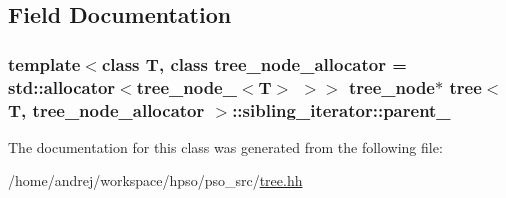 \subsection{Field Documentation}
\hypertarget{classtree_1_1sibling__iterator_204f7449ee908f982d21cc3d334d25bc}{
\subsubsection{\setlength{\rightskip}{0pt plus 5cm}template$<$class T, class tree\_\-node\_\-allocator = std::allocator$<$tree\_\-node\_\-$<$T$>$ $>$$>$ {\bf tree\_\-node}$\ast$ {\bf tree}$<$ T, tree\_\-node\_\-allocator $>$::{\bf sibling\_\-iterator::parent\_\-}}}
\label{classtree_1_1sibling__iterator_204f7449ee908f982d21cc3d334d25bc}




The documentation for this class was generated from the following file:\begin{CompactItemize}
\item 
/home/andrej/workspace/hpso/pso\_\-src/\hyperlink{tree_8hh}{tree.hh}\end{CompactItemize}
